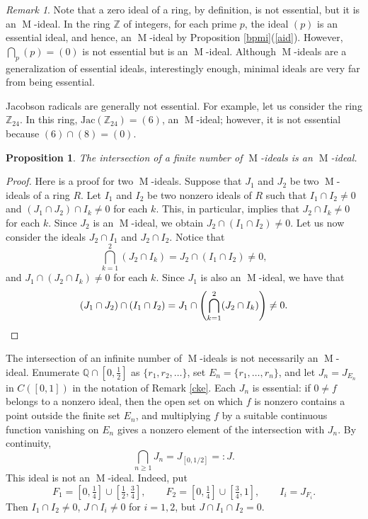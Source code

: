 \documentclass[11pt,leqno]{amsart}
\DeclareMathOperator{\m}{M}
\newtheorem{proposition}[theorem]{Proposition}
\theoremstyle{definition}
\theoremstyle{remark}
\newtheorem{remark}[theorem]{Remark}
\numberwithin{equation}{section}
\numberwithin{equation}{section}
\begin{document}
\begin{remark}
Note that a zero ideal of a ring, by definition, is not essential, but it is an $\m$-ideal. In the ring $\mathds{Z}$ of integers, for each prime $p$, the ideal $(p)$ is an essential ideal, and hence, an $\m$-ideal by Proposition \ref{bpmi}(\ref{aid}).   However, $\bigcap_{p}(p)=(0)$ is not essential but is an $\m$-ideal. Although $\m$-ideals are a generalization of essential ideals, interestingly enough, minimal ideals are very far from being essential.

Jacobson radicals are generally not essential. For example, let us consider the ring $\mathds{Z}_{24}$. In this ring, $\mathrm{Jac}(\mathds{Z}_{24})=(6)$, an $\m$-ideal; however, it is not essential because $(6)\cap  (8)=(0)$.    
\end{remark}


\begin{proposition}
\label{new} 
The intersection of a finite number of $\m$-ideals is an $\m$-ideal. \end{proposition}
	
\begin{proof}
Here is a proof for two $\m$-ideals.  Suppose that $J_1$ and $J_2$ be two $\m$-ideals of a ring $R$. Let $I_1$ and $I_2$ be two nonzero ideals of $R$ such that $I_1\cap I_2\neq 0$ and $(J_1\cap J_2)\cap I_k\neq 0$ for each
$k$. This, in particular, implies that $J_2 \cap I_k\neq 0$ for each $k$. Since $J_2$ is an $\m$-ideal, we obtain $J_2\cap (I_1\cap I_2)\neq 0$. Let us now consider the ideals $J_2\cap I_1$ and $J_2\cap I_2$. Notice that 
\[\bigcap_{k=1}^2 (J_2\cap I_k)=J_2\cap (I_1\cap I_2)\neq 0,\]
and $J_1\cap (J_2\cap I_k)\neq 0$ for each $k$. Since $J_1$ is also an $\m$-ideal, we have that
\[(J_1\cap J_2)\cap (I_1\cap I_2)=J_1\cap \left( \bigcap_{k=1}^2 (J_2 \cap I_k) \right)\neq 0.\qedhere\]
\end{proof}

The intersection of an infinite number of $\m$-ideals is not necessarily an $\m$-ideal. Enumerate $\mathbb{Q}\cap[0,\tfrac12]$ as $\{r_1,r_2,\ldots\}$, set $E_n=\{r_1,\ldots,r_n\}$, and let $J_n=J_{E_n}$ in $C([0,1])$ in the notation of Remark  \ref{cke}. Each $J_n$ is essential: if $0\neq f$ belongs to a nonzero ideal, then the open set on which $f$ is nonzero contains a point outside the finite set $E_n$, and multiplying $f$ by a suitable continuous function vanishing on $E_n$ gives a nonzero element of the intersection with $J_n$. By continuity,
\[
\bigcap_{n\geq 1}J_n=J_{[0,1/2]}=:J.
\]
This ideal is not an $\m$-ideal. Indeed, put
\[
F_1=[0,\tfrac14]\cup[\tfrac12,\tfrac34],\qquad
F_2=[0,\tfrac14]\cup[\tfrac34,1],\qquad I_i=J_{F_i}.
\]
Then $I_1\cap I_2\neq 0$, $J\cap I_i\neq 0$ for $i=1,2$, but $J\cap I_1\cap I_2=0$.
\end{document}
